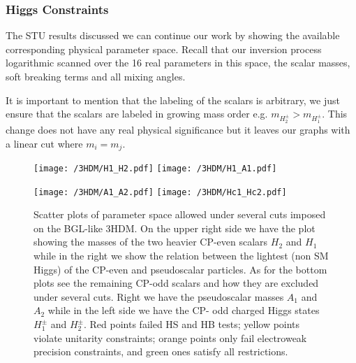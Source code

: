 
\subsubsection{Higgs Constraints}

The STU results discussed we can continue our work by showing the available corresponding physical parameter space. 
%
Recall that our inversion process logarithmic scanned over the 16 real parameters in this space, the scalar masses, soft breaking terms and all mixing angles.  
%
%

It is important to mention that the labeling of the scalars is arbitrary, we just ensure that the scalars are labeled in growing mass order e.g. $m_{H^\pm_2} > m_{H^\pm_1}$. 
%
This change does not have any real physical significance but it leaves our graphs with a linear cut where $m_i = m_j$. 
%
\begin{figure}[H]
	\centering
	\texttt{[image: /3HDM/H1\_H2.pdf]}
	\texttt{[image: /3HDM/H1\_A1.pdf]}
\end{figure}	
\begin{figure}[H]\ContinuedFloat
    \centering
	\texttt{[image: /3HDM/A1\_A2.pdf]}
	\texttt{[image: /3HDM/Hc1\_Hc2.pdf]}
	\caption{Scatter plots of parameter space allowed under several cuts imposed on the BGL-like 3HDM. On the upper right side we have the plot showing the masses of the two heavier CP-even scalars $H_2$ and $H_1$ while in the right we show the relation between the lightest (non SM Higgs) of the CP-even and pseudoscalar particles. As for the bottom plots see the remaining CP-odd scalars and how they are excluded under several cuts. Right we have the pseudoscalar masses $A_1$ and $A_2$ while in the left side we have the CP- odd charged Higgs states $H_1^\pm$ and $H_2^\pm$.	Red points failed HS and HB tests; yellow points violate unitarity constraints; orange points only fail electroweak precision constraints, and green ones satisfy all restrictions.}
	\label{fig:H1_A1_Plots}
\end{figure}	

